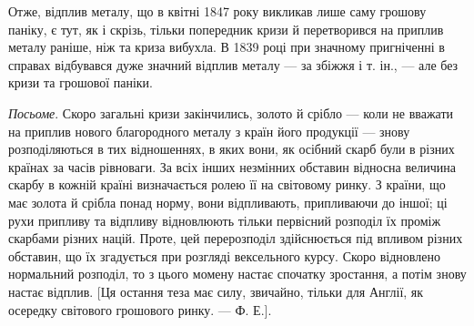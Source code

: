 Отже, відплив металу, що в квітні 1847 року викликав лише саму грошову
паніку, є тут, як і скрізь, тільки попередник кризи й перетворився на
приплив металу раніше, ніж та криза вибухла. В 1839 році при значному пригніченні
в справах відбувався дуже значний відплив металу — за збіжжя і т. ін., —
але без кризи та грошової паніки.

\emph{Посьоме}. Скоро загальні кризи закінчились, золото й срібло — коли не
вважати на приплив нового благородного металу з країн його продукції —
знову розподіляються в тих відношеннях, в яких вони, як осібний скарб
були в різних країнах за часів рівноваги. За всіх інших незмінних обставин
відносна величина скарбу в кожній країні визначається ролею її на світовому
ринку. З країни, що має золота й срібла понад норму, вони відпливають, припливаючи
до іншої; ці рухи припливу та відпливу відновлюють тільки первісний
розподіл їх проміж скарбами різних націй. Проте, цей перерозподіл здійснюється
під впливом різних обставин, що їх згадується при розгляді вексельного курсу.
Скоро відновлено нормальний розподіл, то з цього момену настає спочатку зростання,
а потім знову настає відплив. [Ця остання теза має силу, звичайно,
тільки для Англії, як осередку світового грошового ринку. — Ф. Е.].
